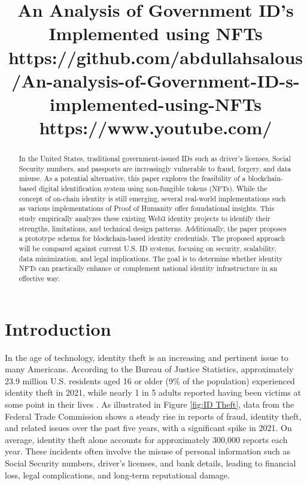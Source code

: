 \documentclass[conference]{IEEEtran}
\begin{document}
\title {An Analysis of Government ID’s Implemented using NFTs \\[1ex] \large https://github.com/abdullahsalous/An-analysis-of-Government-ID-s-implemented-using-NFTs \\[1ex] \large https://www.youtube.com/}

\author{
}

\maketitle

\begin{abstract}
In the United States, traditional government-issued IDs such as driver's licenses, Social Security numbers, and passports are increasingly vulnerable to fraud, forgery, and data misuse. As a potential alternative, this paper explores the feasibility of a blockchain-based digital identification system using non-fungible tokens (NFTs). While the concept of on-chain identity is still emerging, several real-world implementations such as various implementations of Proof of Humanity offer foundational insights. This study empirically analyzes these existing Web3 identity projects to identify their strengths, limitations, and technical design patterns. Additionally, the paper proposes a prototype schema for blockchain-based identity credentials. The proposed approach will be compared against current U.S. ID systems, focusing on security, scalability, data minimization, and legal implications. The goal is to determine whether identity NFTs can practically enhance or complement national identity infrastructure in an effective way.
\end{abstract}

\section{Introduction}
In the age of technology, identity theft is an increasing and pertinent issue to many Americans. According to the Bureau of Justice Statistics, approximately 23.9 million U.S. residents aged 16 or older (9\% of the population) experienced identity theft in 2021, while nearly 1 in 5 adults reported having been victims at some point in their lives \cite{Bureau of Justice Statistics}. As illustrated in Figure \ref{fig:ID Theft}, data from the Federal Trade Commission shows a steady rise in reports of fraud, identity theft, and related issues over the past five years, with a significant spike in 2021. On average, identity theft alone accounts for approximately 300,000 reports each year. These incidents often involve the misuse of personal information such as Social Security numbers, driver's licenses, and bank details, leading to financial loss, legal complications, and long-term reputational damage. 
\end{document}
